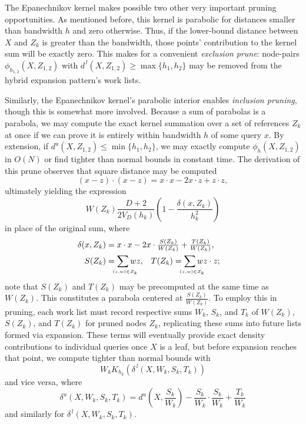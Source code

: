 \documentclass[twoside,leqno,twocolumn]{article}
\newcommand{\lo}[1]{#1^{\,l}}
\newcommand{\hi}[1]{#1^u}
\newcommand{\leftlim}[1]{\lefteqn{\scriptscriptstyle #1}}
\begin{document}
The Epanechnikov kernel makes possible two other very important
pruning opportunities.  As mentioned before, this kernel is parabolic
for distances smaller than bandwidth $h$ and zero otherwise.  Thus, if
the lower-bound distance between $X$ and $Z_k$ is greater than the
bandwidth, those points' contribution to the kernel sum will be
exactly zero.  This makes for a convenient {\em exclusion prune}:
node-pairs $\phi_{h_{1,2}}(X,Z_{1,2})$ with $\lo{d}(X,Z_{1,2}) \geq
\max\{h_1,h_2\}$ may be removed from the hybrid expansion pattern's
work lists.

Similarly, the Epanechnikov kernel's parabolic interior enables {\em
inclusion pruning}, though this is somewhat more involved.  Because a
sum of parabolas is a parabola, we may compute the exact kernel
summation over a set of references $Z_k$ at once if we can prove it is
entirely within bandwidth $h$ of some query $x$.  By extension, if
$\hi{d}(X,Z_{1,2}) \leq \min\{h_1,h_2\}$, we may exactly compute
$\phi_h(X,Z_{1,2})$ in $O(N)$ or find tighter than normal bounds in
constant time.  The derivation of this prune observes that square
distance may be computed
\begin{equation}
  (x - z) \cdot (x - z) = x \cdot x - 2 x \cdot z + z \cdot z ,
\end{equation}
ultimately yielding the expression
\begin{equation}
  W(Z_k) \frac{D + 2}{2 V_D(h_k)} \left( 1 - \frac{\delta(x,Z_k)}{h_k^2} \right)
\end{equation}
in place of the original sum, where
\begin{align}
  \delta(x,Z_k) & = \lefteqn{\textstyle x \cdot x - 2x \cdot \frac{S(Z_k)}{W(Z_k)} + \frac{T(Z_k)}{W(Z_k)} ,} \\
  S(Z_k) & = \sum_{\leftlim{(z,w) \in Z_k}} w z , & T(Z_k) & = \sum_{\leftlim{(z,w) \in Z_k}} w z \cdot z ;
\end{align}
note that $S(Z_k)$ and $T(Z_k)$ may be precomputed at the same time as
$W(Z_k)$.  This constitutes a parabola centered at
$\frac{S(Z_k)}{W(Z_k)}$.  To employ this in pruning, each work list
must record respective sums $W_k$, $S_k$, and $T_k$ of $W(Z_k)$,
$S(Z_k)$, and $T(Z_k)$ for pruned nodes $Z_k$, replicating these sums
into future lists formed via expansion.  These terms will eventually
provide exact density contributions to individual queries once $X$ is
a leaf, but before expansion reaches that point, we compute tighter
than normal bounds with
\begin{equation}
  W_k K_{h_k}(\lo{\delta}(X,W_k,S_k,T_k))
\end{equation}
and vice versa, where
\begin{equation}
  \textstyle \hi{\delta}(X,W_k,S_k,T_k) = \hi{d} \! \left( X,\frac{S_k}{W_k} \right) - \frac{S_k}{W_k} \cdot \frac{S_k}{W_k} + \frac{T_k}{W_k}
\end{equation}
and similarly for $\lo{\delta}(X,W_k,S_k,T_k)$.
\end{document}
